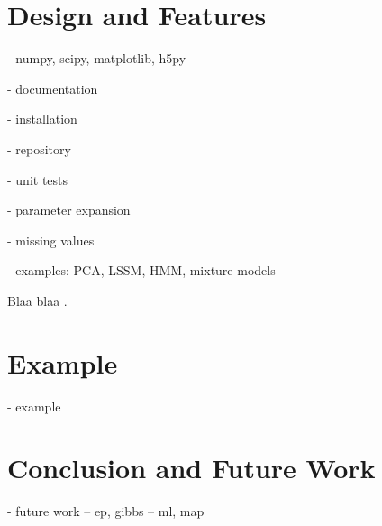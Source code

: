 \documentclass[twoside,11pt]{article}
\begin{document}
\section{Design and Features}

- numpy, scipy, matplotlib, h5py

- documentation

- installation

- repository

- unit tests

- parameter expansion

- missing values

- examples: PCA, LSSM, HMM, mixture models

Blaa blaa \cite{Luttinen:2013}.


\section{Example}

- example

\section{Conclusion and Future Work}

- future work
-- ep, gibbs
-- ml, map







\vskip 0.2in

\end{document}

